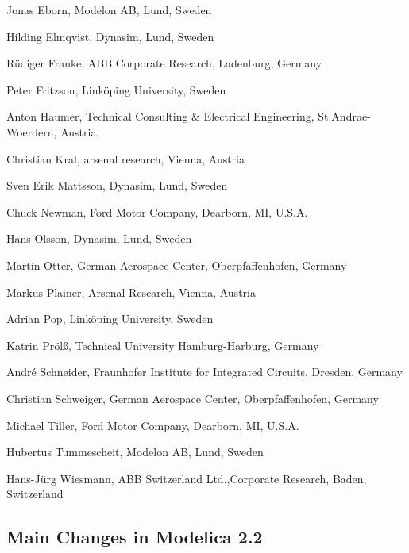 Jonas Eborn, Modelon AB, Lund, Sweden

Hilding Elmqvist, Dynasim, Lund, Sweden

Rüdiger Franke, ABB Corporate Research, Ladenburg, Germany

Peter Fritzson, Linköping University, Sweden

Anton Haumer, Technical Consulting \& Electrical Engineering,
St.Andrae-Woerdern, Austria

Christian Kral, arsenal research, Vienna, Austria

Sven Erik Mattsson, Dynasim, Lund, Sweden

Chuck Newman, Ford Motor Company, Dearborn, MI, U.S.A.

Hans Olsson, Dynasim, Lund, Sweden

Martin Otter, German Aerospace Center, Oberpfaffenhofen, Germany

Markus Plainer, Arsenal Research, Vienna, Austria

Adrian Pop, Linköping University, Sweden

Katrin Prölß, Technical University Hamburg-Harburg, Germany

André Schneider, Fraunhofer Institute for Integrated Circuits, Dresden,
Germany

Christian Schweiger, German Aerospace Center, Oberpfaffenhofen, Germany

Michael Tiller, Ford Motor Company, Dearborn, MI, U.S.A.

Hubertus Tummescheit, Modelon AB, Lund, Sweden

Hans-Jürg Wiesmann, ABB Switzerland Ltd.,Corporate Research, Baden,
Switzerland

\subsection{Main Changes in Modelica 2.2}\label{main-changes-in-modelica-2-2}

